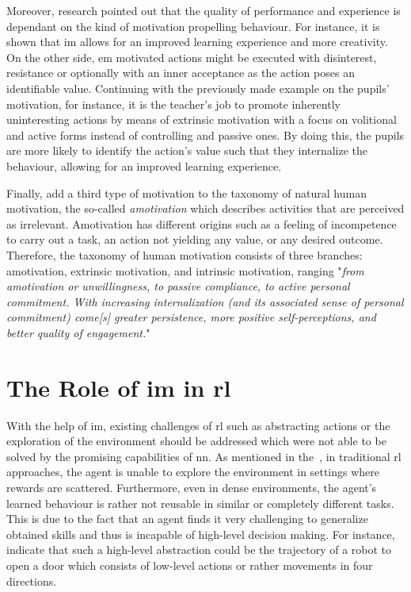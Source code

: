 \documentclass[draft,final]{vutinfth} %
\newcommand{\p}[1]{see p. #1}
\begin{document}
    Moreover, research pointed out that the quality of performance and experience is dependant on the kind of motivation propelling behaviour.
    For instance, it is shown that \gls{im} allows for an improved learning experience and more creativity.
    On the other side, \gls{em} motivated actions might be executed with disinterest, resistance or optionally with an inner acceptance as the action poses an identifiable value.
    Continuing with the previously made example on the pupils' motivation, for instance, it is the teacher's job to promote inherently uninteresting actions by means of extrinsic motivation with a focus on volitional and active forms instead of controlling and passive ones.
    By doing this, the pupils are more likely to identify the action's value such that they internalize the behaviour, allowing for an improved learning experience.

    Finally, \citeauthor{ryan_intrinsic_2000} add a third type of motivation to the taxonomy of natural human motivation, the so-called \textit{amotivation} which describes activities that are perceived as irrelevant.
    Amotivation has different origins such as a feeling of incompetence to carry out a task, an action not yielding any value, or any desired outcome.
    Therefore, the taxonomy of human motivation consists of three branches: amotivation, extrinsic motivation, and intrinsic motivation, ranging "\textit{from amotivation or unwillingness, to passive compliance, to active personal commitment. With increasing internalization (and its associated sense of personal commitment) come[s] greater persistence, more positive self-perceptions, and better quality of engagement.}"~\citep[\p{60f}]{ryan_intrinsic_2000}


    \section[The Role of IM in RL]{The Role of \gls{im} in \gls{rl}}

    With the help of \gls{im}, existing challenges of \gls{rl} such as abstracting actions or the exploration of the environment should be addressed which were not able to be solved by the promising capabilities of \gls{nn}.
    As mentioned in the~, in traditional \gls{rl} approaches, the agent is unable to explore the environment in settings where rewards are scattered.
    Furthermore, even in dense environments, the agent's learned behaviour is rather not reusable in similar or completely different tasks.
    This is due to the fact that an agent finds it very challenging to generalize obtained skills and thus is incapable of high-level decision making.
    For instance, \citeauthor{todorov_mujoco_2012} indicate that such a high-level abstraction could be the trajectory of a robot to open a door which consists of low-level actions or rather movements in four directions.
\end{document}
